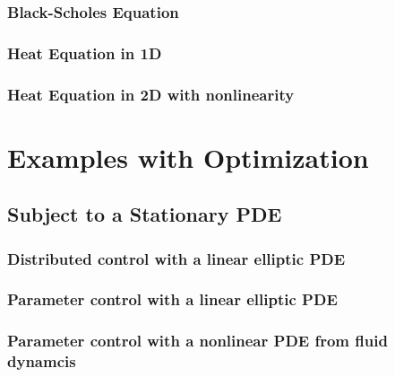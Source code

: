 \documentclass[a4paper,cleardoubleempty]{scrreprt}
\begin{document}
\subsection{Black-Scholes Equation}
\label{PDE_Instat_Black_Scholes}

\clearpage
\subsection{Heat Equation in 1D}
\label{PDE_Instat_Heat_1D}

\clearpage
\subsection{Heat Equation in 2D with nonlinearity}
\label{PDE_Instat_Heat_2D}

\cleardoublepage
\chapter{Examples with Optimization}
\label{OPT}
\section{Subject to a Stationary PDE}
\label{OPT_Stat}
\subsection{Distributed control with a linear elliptic PDE}
\label{OPT_Stat_Distrib_Lin_Ellipt}

\clearpage
\subsection{Parameter control with a linear elliptic PDE}
\label{OPT_Stat_Param_Lin_Ellipt}

\clearpage
\subsection{Parameter control with a nonlinear PDE from fluid dynamcis}
\label{OPT_Stat_Param_Nonlin_Fluid}

\clearpage
\end{document}
